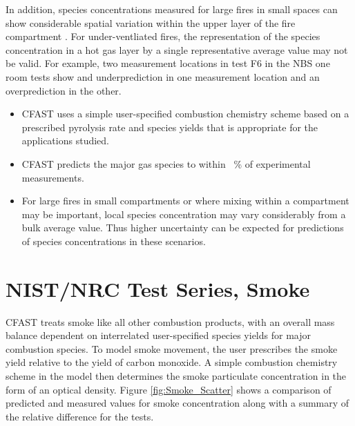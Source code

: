 In addition, species concentrations measured for large fires in small spaces can show considerable spatial variation within the upper layer of the fire compartment \cite{Bundy:2007}. For under-ventliated fires, the representation of the species concentration in a hot gas layer by a single representative average value may not be valid. For example, two measurement locations in test F6 in the NBS one room tests show and underprediction in one measurement location and an overprediction in the other.

\begin{itemize}
\item CFAST uses a simple user-specified combustion chemistry scheme based on a prescribed pyrolysis rate and species yields that is appropriate for the applications studied.
\item CFAST predicts the major gas species to within \Speciesavg ~\% of experimental measurements.
\item For large fires in small compartments or where mixing within a compartment may be important, local species concentration may vary considerably from a bulk average value.  Thus higher uncertainty can be expected for predictions of species concentrations in these scenarios.
\end{itemize}

\section{NIST/NRC Test Series, Smoke}

CFAST treats smoke like all other combustion products, with an overall mass balance dependent on interrelated user-specified species yields for major combustion species.  To model smoke movement, the user prescribes the smoke yield relative to the yield of carbon monoxide.  A simple combustion chemistry scheme in the model then determines the smoke particulate concentration in the form of an optical density.  Figure \ref{fig:Smoke_Scatter} shows a comparison of predicted and measured values for smoke concentration along with a summary of the relative difference for the tests.

